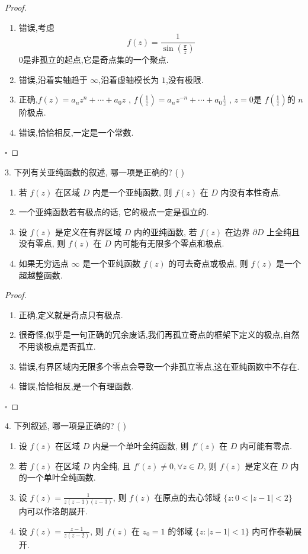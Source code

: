 \documentclass[../../复变函数.tex]{subfiles}
\begin{document}
\begin{proof}
  \begin{enumerate}
    \item 错误,考虑 \[
    f\left( z \right)= \frac{1 }{\sin \left( \frac{\pi  }{z }  \right)   }  
    \] \(  0  \)是非孤立的起点,它是奇点集的一个聚点.
    \item 错误,沿着实轴趋于 \(  \infty  \),沿着虚轴模长为 \(  1  \),没有极限.  
    \item 正确,\(  f\left( z \right)= a_{n}z^{n}+ \cdots + a_0z  \) , \(  f\left( \frac{1 }{z }  \right)= a_{n}z^{-n}+ \cdots + a_{0}\frac{1 }{z }    \) , \(  z= 0  \)是 \(  f\left( \frac{1 }{z }  \right)   \)的 \(  n  \)阶极点.   
    \item 错误,恰恰相反,一定是一个常数.
  \end{enumerate}
  

  \hfill $\square$
\end{proof}

\begin{problem}
3. 下列有关亚纯函数的叙述, 哪一项是正确的? ( )
\begin{enumerate}
    \item 若 $f(z)$ 在区域 $D$ 内是一个亚纯函数, 则 $f(z)$ 在 $D$ 内没有本性奇点.
    \item 一个亚纯函数若有极点的话, 它的极点一定是孤立的.
    \item 设 $f(z)$ 是定义在有界区域 $D$ 内的亚纯函数, 若 $f(z)$ 在边界 $\partial D$ 上全纯且没有零点, 则 $f(z)$ 在 $D$ 内可能有无限多个零点和极点.
    \item 如果无穷远点 $\infty$ 是一个亚纯函数 $f(z)$ 的可去奇点或极点, 则 $f(z)$ 是一个超越整函数.
\end{enumerate}
\end{problem}
\begin{proof}
  \begin{enumerate}
    \item 正确,定义就是奇点只有极点.
    \item 很奇怪,似乎是一句正确的冗余废话,我们再孤立奇点的框架下定义的极点,自然不用谈极点是否孤立.
    \item 错误,有界区域内无限多个零点会导致一个非孤立零点,这在亚纯函数中不存在.
    \item 错误,恰恰相反,是一个有理函数.
  \end{enumerate}
  

  \hfill $\square$
\end{proof}
\begin{problem}
4. 下列叙述, 哪一项是正确的? ( )
\begin{enumerate}
    \item 设 $f(z)$ 在区域 $D$ 内是一个单叶全纯函数, 则 $f'(z)$ 在 $D$ 内可能有零点.
    \item 若 $f(z)$ 在区域 $D$ 内全纯, 且 $f'(z) \ne 0, \forall z \in D$, 则 $f(z)$ 是定义在 $D$ 内的一个单叶全纯函数.
    \item 设 $f(z) = \frac{1}{z(z-1)(z-3)}$, 则 $f(z)$ 在原点的去心邻域 $\{z: 0 < |z-1| < 2\}$ 内可以作洛朗展开.
    \item 设 $f(z) = \frac{z-1}{z(z-2)}$, 则 $f(z)$ 在 $z_0 = 1$ 的邻域 $\{z: |z-1| < 1\}$ 内可作泰勒展开.
\end{enumerate}
\end{problem}
\end{document}
